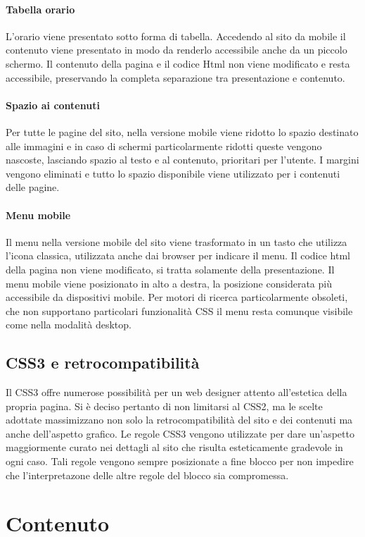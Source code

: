 \documentclass[12pt,a4paper]{article}
\begin{document}
\paragraph{Tabella orario}
L'orario viene presentato sotto forma di tabella. Accedendo al sito da mobile il contenuto viene presentato in modo da renderlo accessibile anche da un piccolo schermo. 
Il contenuto della pagina e il codice Html non viene modificato e resta accessibile, preservando la completa separazione tra presentazione e contenuto. 

\paragraph{Spazio ai contenuti} Per tutte le pagine del sito, nella versione mobile viene ridotto lo spazio destinato alle immagini e in caso di schermi particolarmente ridotti queste vengono nascoste, lasciando spazio al testo e al contenuto, prioritari per l'utente. 
I margini vengono eliminati e tutto lo spazio disponibile viene utilizzato per i contenuti delle pagine.

\paragraph{Menu mobile} Il menu nella versione mobile del sito viene trasformato in un tasto che utilizza l'icona classica, utilizzata anche dai browser per indicare il menu. 
Il codice html della pagina non viene modificato, si tratta solamente della presentazione. 
Il menu mobile viene posizionato in alto a destra, la posizione considerata più accessibile da dispositivi mobile. 
Per motori di ricerca particolarmente obsoleti, che non supportano particolari funzionalità CSS il menu resta comunque visibile come nella modalità desktop.
\subsection{CSS3 e retrocompatibilità}
Il CSS3 offre numerose possibilità per un web designer attento all'estetica della propria pagina. 
Si è deciso pertanto di non limitarsi al CSS2, ma le scelte adottate massimizzano non solo la retrocompatibilità del sito e dei contenuti ma anche dell'aspetto grafico. 
Le regole CSS3 vengono utilizzate per dare un'aspetto maggiormente curato nei dettagli al sito che risulta esteticamente gradevole in ogni caso. 
Tali regole vengono sempre posizionate a fine blocco per non impedire che l'interpretazone delle altre regole del blocco sia compromessa. 
\section{Contenuto}
\end{document}
